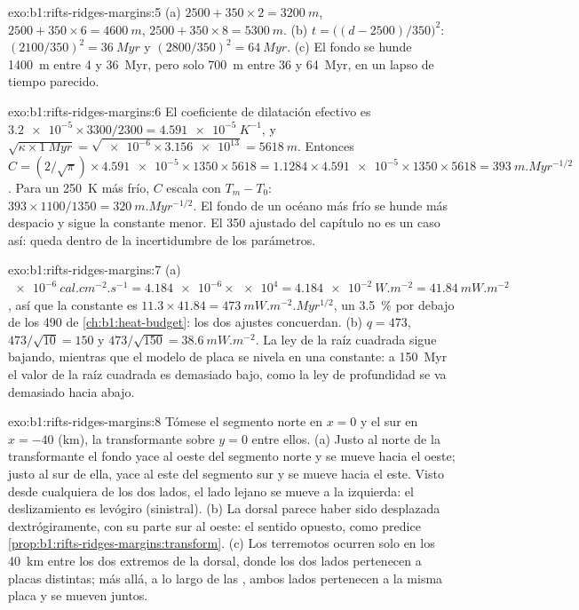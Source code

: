 \begin{solution}{exo:b1:rifts-ridges-margins:5}
(a) $2500 + 350\times2 = \qty{3200}{m}$, $2500 + 350\times6 = \qty{4600}{m}$,
$2500 + 350\times8 = \qty{5300}{m}$. (b) $t = \bigl((d - 2500)/350\bigr)^2$:
$(2100/350)^2 = \qty{36}{Myr}$ y $(2800/350)^2 = \qty{64}{Myr}$. (c) El
fondo se hunde \qty{1400}{m} entre 4 y \qty{36}{Myr}, pero solo \qty{700}{m}
entre 36 y \qty{64}{Myr}, en un lapso de tiempo parecido.
\end{solution}

\begin{solution}{exo:b1:rifts-ridges-margins:6}
El coeficiente de dilatación efectivo es
$\num{3.2e-5}\times3300/2300 = \qty{4.591e-5}{K^{-1}}$, y
$\sqrt{\kappa\times\qty{1}{Myr}} = \sqrt{\num{e-6}\times\num{3.156e13}} =
\qty{5618}{m}$. Entonces $C = (2/\sqrt\pi)\times\num{4.591e-5}\times1350\times5618 =
1.1284\times\num{4.591e-5}\times1350\times5618 = \qty{393}{m.Myr^{-1/2}}$. Para un 
\qty{250}{K} más frío, $C$ escala con $T_m - T_0$:
$393\times1100/1350 = \qty{320}{m.Myr^{-1/2}}$. El fondo de un océano más frío
se hunde más despacio y sigue la constante menor. El \num{350} ajustado del
capítulo no es un caso así: queda dentro de la incertidumbre de los parámetros.
\end{solution}

\begin{solution}{exo:b1:rifts-ridges-margins:7}
(a) $\qty{e-6}{cal.cm^{-2}.s^{-1}} = \num{4.184e-6}\times\num{e4} =
\qty{4.184e-2}{W.m^{-2}} = \qty{41.84}{mW.m^{-2}}$, así que la constante es
$11.3\times41.84 = \qty{473}{mW.m^{-2}.Myr^{1/2}}$, un \qty{3.5}{\percent} por debajo de
los 490 de \cref{ch:b1:heat-budget}: los dos ajustes concuerdan. (b) $q = 473$,
$473/\sqrt{10} = 150$ y $473/\sqrt{150} = \qty{38.6}{mW.m^{-2}}$. La
ley de la raíz cuadrada sigue bajando, mientras que el modelo de placa se nivela en una constante:
a \qty{150}{Myr} el valor de la raíz cuadrada es demasiado bajo, como la ley de
profundidad se va demasiado hacia abajo.
\end{solution}

\begin{solution}{exo:b1:rifts-ridges-margins:8}
Tómese el segmento norte en $x = 0$ y el sur en $x = -40$
(km), la transformante sobre $y = 0$ entre ellos. (a) Justo al norte de la transformante el
fondo yace al oeste del segmento norte y se mueve hacia el oeste; justo al sur de ella, yace
al este del segmento sur y se mueve hacia el este. Visto desde cualquiera de los dos lados, el
lado lejano se mueve a la izquierda: el deslizamiento es levógiro (sinistral). (b) La
dorsal parece haber sido desplazada dextrógiramente, con su parte sur al
oeste: el sentido opuesto, como predice \cref{prop:b1:rifts-ridges-margins:transform}.
(c) Los terremotos ocurren solo en los \qty{40}{km} entre los dos extremos de la dorsal,
donde los dos lados pertenecen a placas distintas; más allá, a lo largo de las
, ambos lados pertenecen a la misma placa y se mueven juntos.
\end{solution}

